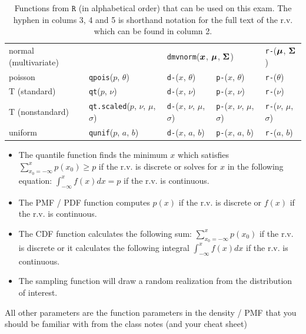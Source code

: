 \documentclass[12pt]{article}
\begin{document}
\begin{table}[htp]
\begin{tabular}{l | llll}
normal (multivariate) & 
& \multicolumn{2}{l}{\texttt{dmvnorm}($\boldsymbol{x}$, $\boldsymbol{\mu}$, $\boldsymbol{\Sigma}$)} 
& \texttt{r-}($\boldsymbol{\mu}$, $\boldsymbol{\Sigma}$) \\

poisson & \texttt{qpois}($p$, $\theta$) 
& \texttt{d-}($x$, $\theta$)
& \texttt{p-}($x$, $\theta$) 
& \texttt{r-}($\theta$) \\

T (standard) & \texttt{qt}($p$, $\nu$) 
& \texttt{d-}($x$, $\nu$) 
& \texttt{p-}($x$, $\nu$)
& \texttt{r-}($\nu$) \\

T (nonstandard) & \texttt{qt.scaled}($p$, $\nu$, $\mu$, $\sigma$) 
& \texttt{d-}($x$, $\nu$, $\mu$, $\sigma$)
& \texttt{p-}($x$, $\nu$, $\mu$, $\sigma$) 
& \texttt{r-}($\nu$, $\mu$, $\sigma$) \\

uniform & \texttt{qunif}($p$, $a$, $b$) 
& \texttt{d-}($x$, $a$, $b$)
& \texttt{p-}($x$, $a$, $b$) 
& \texttt{r-}($a$, $b$) \\


\end{tabular}
\caption{Functions from $\texttt{R}$ (in alphabetical order) that can be used on this exam. The hyphen in colums 3, 4 and 5 is shorthand notation for the full text of the r.v. which can be found in column 2.
}
\label{tab:eqs}
\end{table}

\begin{itemize}
\item The quantile function finds the minimum $x$ which satisfies  $\sum_{x_0 = -\infty}^{x} p(x_0) \geq p$ if the r.v. is discrete or solves for $x$ in the following equation: $\int_{-\infty}^x f(x) dx = p$ if the r.v. is continuous.

\item The PMF / PDF function computes $p(x)$ if the r.v. is discrete or $f(x)$ if the r.v. is continuous.

\item The CDF function calculates the following sum: $\sum_{x_0 = -\infty}^{x} p(x_0)$ if the r.v. is discrete or it calculates the following integral $\int_{-\infty}^x f(x) dx$ if the r.v. is continuous.

\item The sampling function will draw a random realization from the distribution of interest.
\end{itemize}
All other parameters are the function parameters in the density / PMF that you should be familiar with from the class notes (and your cheat sheet)
\end{document}
